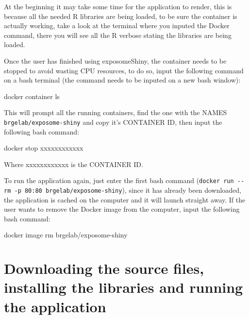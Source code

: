 \documentclass[
]{book}
\newenvironment{Shaded}{\begin{snugshade}}{\end{snugshade}}
\newcommand{\ExtensionTok}[1]{#1}
\newcommand{\NormalTok}[1]{#1}
\begin{document}
At the beginning it may take some time for the application to render, this is because all the needed R libraries are being loaded, to be sure the container is actually working, take a look at the terminal where you inputed the Docker command, there you will see all the R verbose stating the libraries are being loaded.

Once the user has finished using exposomeShiny, the container needs to be stopped to avoid wasting CPU resources, to do so, input the following command on a bash terminal (the command needs to be inputed on a new bash window):

\begin{Shaded}
\begin{Highlighting}[]
\ExtensionTok{docker}\NormalTok{ container ls}
\end{Highlighting}
\end{Shaded}

This will prompt all the running containers, find the one with the NAMES \texttt{brgelab/exposome-shiny} and copy it's CONTAINER ID, then input the following bash command:

\begin{Shaded}
\begin{Highlighting}[]
\ExtensionTok{docker}\NormalTok{ stop xxxxxxxxxxxx}
\end{Highlighting}
\end{Shaded}

Where xxxxxxxxxxxx is the CONTAINER ID.

To run the application again, just enter the first bash command (\texttt{docker\ run\ -\/-rm\ -p\ 80:80\ brgelab/exposome-shiny}), since it has already been downloaded, the application is cached on the computer and it will launch straight away. If the user wants to remove the Docker image from the computer, input the following bash command:

\begin{Shaded}
\begin{Highlighting}[]
\ExtensionTok{docker}\NormalTok{ image rm brgelab/exposome-shiny}
\end{Highlighting}
\end{Shaded}

\hypertarget{downloading-the-source-files-installing-the-libraries-and-running-the-application}{%
\section{Downloading the source files, installing the libraries and running the application}\label{downloading-the-source-files-installing-the-libraries-and-running-the-application}}
\end{document}
